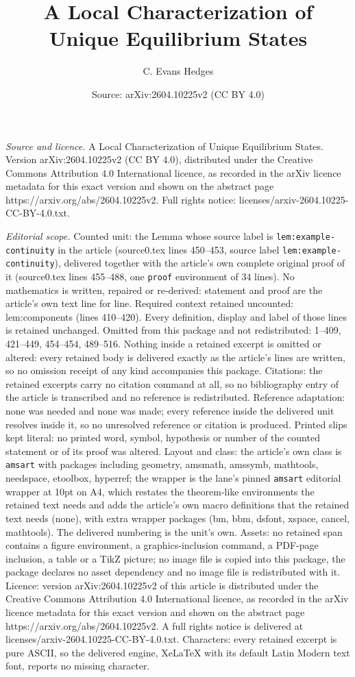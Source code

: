 \documentclass[10pt,a4paper]{amsart}
\title[A Local Characterization of Unique Equilibrium States]{A Local Characterization of Unique Equilibrium States}
\author{C. Evans Hedges}
\date{Source: arXiv:2604.10225v2 (CC BY 4.0)}
\begin{document}
\maketitle

\noindent\emph{Source and licence.} A Local Characterization of Unique Equilibrium States. Version arXiv:2604.10225v2 (CC BY 4.0), distributed under the Creative Commons Attribution 4.0 International licence, as recorded in the arXiv licence metadata for this exact version and shown on the abstract page https://arxiv.org/abs/2604.10225v2. Full rights notice: licenses/arxiv-2604.10225-CC-BY-4.0.txt.\par\smallskip

\noindent\textit{Editorial scope.} Counted unit: the Lemma whose source label is \texttt{lem:example-continuity} in the article (source0.tex lines 450--453, source label \texttt{lem:example-continuity}), delivered together with the article's own complete original proof of it (source0.tex lines 455--488, one \texttt{proof} environment of 34 lines). No mathematics is written, repaired or re-derived: statement and proof are the article's own text line for line. Required context retained uncounted: lem:components (lines 410--420). Every definition, display and label of those lines is retained unchanged. Omitted from this package and not redistributed: 1--409, 421--449, 454--454, 489--516. Nothing inside a retained excerpt is omitted or altered: every retained body is delivered exactly as the article's lines are written, so no omission receipt of any kind accompanies this package. Citations: the retained excerpts carry no citation command at all, so no bibliography entry of the article is transcribed and no reference is redistributed. Reference adaptation: none was needed and none was made; every reference inside the delivered unit resolves inside it, so no unresolved reference or citation is produced. Printed slips kept literal: no printed word, symbol, hypothesis or number of the counted statement or of its proof was altered. Layout and class: the article's own class is \texttt{amsart} with packages including geometry, amsmath, amssymb, mathtools, needspace, etoolbox, hyperref; the wrapper is the lane's pinned \texttt{amsart} editorial wrapper at 10pt on A4, which restates the theorem-like environments the retained text needs and adds the article's own macro definitions that the retained text needs (none), with extra wrapper packages (bm, bbm, dsfont, xspace, cancel, mathtools). The delivered numbering is the unit's own. Assets: no retained span contains a figure environment, a graphics-inclusion command, a PDF-page inclusion, a table or a TikZ picture; no image file is copied into this package, the package declares no asset dependency and no image file is redistributed with it. Licence: version arXiv:2604.10225v2 of this article is distributed under the Creative Commons Attribution 4.0 International licence, as recorded in the arXiv licence metadata for this exact version and shown on the abstract page https://arxiv.org/abs/2604.10225v2. A full rights notice is delivered at licenses/arxiv-2604.10225-CC-BY-4.0.txt. Characters: every retained excerpt is pure ASCII, so the delivered engine, XeLaTeX with its default Latin Modern text font, reports no missing character.
\end{document}
